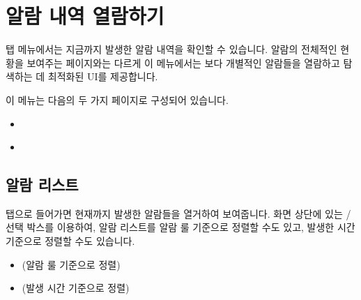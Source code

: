 \documentclass[letterpaper,10pt,english]{sphinxmanual}
\begin{document}
\chapter{알람 내역 열람하기}
\label{\detokenize{anomaly/part05/index:id1}}\label{\detokenize{anomaly/part05/index::doc}}
 탭 메뉴에서는 지금까지 발생한 알람 내역을 확인할 수 있습니다. 알람의 전체적인 현황을 보여주는 {\hyperref[\detokenize{anomaly/part03/index:statistics}]{}} 페이지와는 다르게 이 메뉴에서는 보다 개별적인 알람들을 열람하고 탐색하는 데 최적화된 UI를 제공합니다.

이 메뉴는 다음의 두 가지 페이지로 구성되어 있습니다.
\begin{itemize}
\item {} 
{\hyperref[\detokenize{anomaly/part05/index:alarm-list}]{}}

\item {} 
{\hyperref[\detokenize{anomaly/part05/index:alarm-details}]{}}

\end{itemize}


\section{알람 리스트}
\label{\detokenize{anomaly/part05/index:alarm-list}}\label{\detokenize{anomaly/part05/index:id2}}
 탭으로 들어가면 현재까지 발생한 알람들을 열거하여 보여줍니다. 화면 상단에 있는  /  선택 박스를 이용하여, 알람 리스트를 알람 룰 기준으로 정렬할 수도 있고, 발생한 시간 기준으로 정렬할 수도 있습니다.
\begin{itemize}
\item {} 
 (알람 룰 기준으로 정렬)
\begin{quote}

\begin{figure}[H]
\centering

\noindent{}
\end{figure}
\end{quote}

\item {} 
 (발생 시간 기준으로 정렬)
\begin{quote}

\begin{figure}[H]
\centering

\noindent{}
\end{figure}
\end{quote}

\end{itemize}
\end{document}
